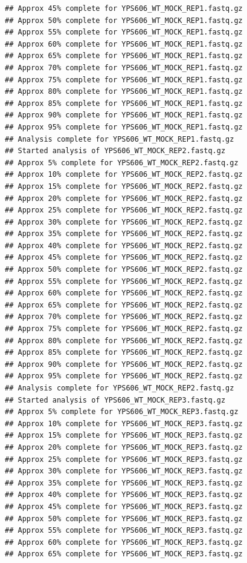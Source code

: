 \documentclass[
]{book}
\begin{document}
\begin{verbatim}
## Approx 45% complete for YPS606_WT_MOCK_REP1.fastq.gz
## Approx 50% complete for YPS606_WT_MOCK_REP1.fastq.gz
## Approx 55% complete for YPS606_WT_MOCK_REP1.fastq.gz
## Approx 60% complete for YPS606_WT_MOCK_REP1.fastq.gz
## Approx 65% complete for YPS606_WT_MOCK_REP1.fastq.gz
## Approx 70% complete for YPS606_WT_MOCK_REP1.fastq.gz
## Approx 75% complete for YPS606_WT_MOCK_REP1.fastq.gz
## Approx 80% complete for YPS606_WT_MOCK_REP1.fastq.gz
## Approx 85% complete for YPS606_WT_MOCK_REP1.fastq.gz
## Approx 90% complete for YPS606_WT_MOCK_REP1.fastq.gz
## Approx 95% complete for YPS606_WT_MOCK_REP1.fastq.gz
## Analysis complete for YPS606_WT_MOCK_REP1.fastq.gz
## Started analysis of YPS606_WT_MOCK_REP2.fastq.gz
## Approx 5% complete for YPS606_WT_MOCK_REP2.fastq.gz
## Approx 10% complete for YPS606_WT_MOCK_REP2.fastq.gz
## Approx 15% complete for YPS606_WT_MOCK_REP2.fastq.gz
## Approx 20% complete for YPS606_WT_MOCK_REP2.fastq.gz
## Approx 25% complete for YPS606_WT_MOCK_REP2.fastq.gz
## Approx 30% complete for YPS606_WT_MOCK_REP2.fastq.gz
## Approx 35% complete for YPS606_WT_MOCK_REP2.fastq.gz
## Approx 40% complete for YPS606_WT_MOCK_REP2.fastq.gz
## Approx 45% complete for YPS606_WT_MOCK_REP2.fastq.gz
## Approx 50% complete for YPS606_WT_MOCK_REP2.fastq.gz
## Approx 55% complete for YPS606_WT_MOCK_REP2.fastq.gz
## Approx 60% complete for YPS606_WT_MOCK_REP2.fastq.gz
## Approx 65% complete for YPS606_WT_MOCK_REP2.fastq.gz
## Approx 70% complete for YPS606_WT_MOCK_REP2.fastq.gz
## Approx 75% complete for YPS606_WT_MOCK_REP2.fastq.gz
## Approx 80% complete for YPS606_WT_MOCK_REP2.fastq.gz
## Approx 85% complete for YPS606_WT_MOCK_REP2.fastq.gz
## Approx 90% complete for YPS606_WT_MOCK_REP2.fastq.gz
## Approx 95% complete for YPS606_WT_MOCK_REP2.fastq.gz
## Analysis complete for YPS606_WT_MOCK_REP2.fastq.gz
## Started analysis of YPS606_WT_MOCK_REP3.fastq.gz
## Approx 5% complete for YPS606_WT_MOCK_REP3.fastq.gz
## Approx 10% complete for YPS606_WT_MOCK_REP3.fastq.gz
## Approx 15% complete for YPS606_WT_MOCK_REP3.fastq.gz
## Approx 20% complete for YPS606_WT_MOCK_REP3.fastq.gz
## Approx 25% complete for YPS606_WT_MOCK_REP3.fastq.gz
## Approx 30% complete for YPS606_WT_MOCK_REP3.fastq.gz
## Approx 35% complete for YPS606_WT_MOCK_REP3.fastq.gz
## Approx 40% complete for YPS606_WT_MOCK_REP3.fastq.gz
## Approx 45% complete for YPS606_WT_MOCK_REP3.fastq.gz
## Approx 50% complete for YPS606_WT_MOCK_REP3.fastq.gz
## Approx 55% complete for YPS606_WT_MOCK_REP3.fastq.gz
## Approx 60% complete for YPS606_WT_MOCK_REP3.fastq.gz
## Approx 65% complete for YPS606_WT_MOCK_REP3.fastq.gz

\end{verbatim}
\end{document}
